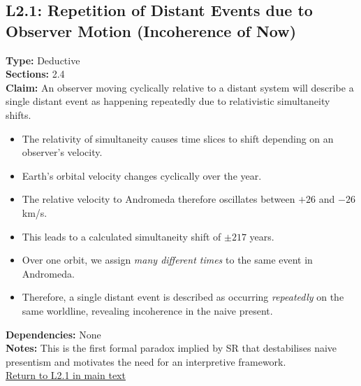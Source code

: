 \documentclass[12pt]{book}
\newcommand{\returnlink}[1]{\hyperref[logic:#1]{Return to #1 in main text}\xspace}
\begin{document}
\subsection*{L2.1: Repetition of Distant Events due to Observer Motion (Incoherence of Now)}\label{appendix:L2.1}
\textbf{Type:} Deductive \\
\textbf{Sections:} 2.4 \\
\textbf{Claim:} An observer moving cyclically relative to a distant system will describe a single distant event as happening repeatedly due to relativistic simultaneity shifts.
\begin{itemize}
  \item The relativity of simultaneity causes time slices to shift depending on an observer's velocity.
  \item Earth's orbital velocity changes cyclically over the year.
  \item The relative velocity to Andromeda therefore oscillates between $+26$ and $-26$ km/s.
  \item This leads to a calculated simultaneity shift of $\pm217$ years.
  \item Over one orbit, we assign \textit{many different times} to the same event in Andromeda.
  \item Therefore, a single distant event is described as occurring \textit{repeatedly} on the same worldline, revealing incoherence in the naive present.
\end{itemize}
\textbf{Dependencies:} None \\
\textbf{Notes:} This is the first formal paradox implied by SR that destabilises naive presentism and motivates the need for an interpretive framework.\\
\returnlink{L2.1}
\end{document}
